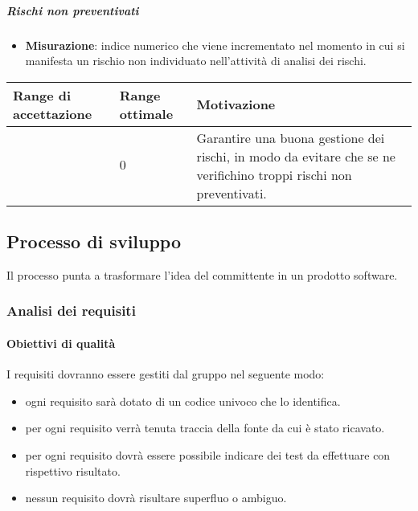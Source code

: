 \subparagraph{Rischi non preventivati}

\begin{itemize}
\item \textbf{Misurazione}: indice numerico che viene incrementato nel momento in cui si manifesta un rischio non individuato nell'attività di analisi dei rischi.
\end{itemize}

\begin{center}
	\begin{tabular}{|P{2.5cm}|P{2.5cm}|P{6cm}|}
		\hline
			\textbf{Range di accettazione}	& \textbf{Range ottimale} & \textbf{Motivazione} \\
			\hline
			[$0 - 5$] & $0$ & Garantire una buona gestione dei rischi, in modo da evitare che se ne verifichino troppi rischi non preventivati. \\
			\hline
			\end{tabular}
\end{center}

\subsection{Processo di sviluppo}

Il processo punta a trasformare l'idea del committente in un prodotto software.

\subsubsection{Analisi dei requisiti}

\paragraph{Obiettivi di qualità}
I requisiti dovranno essere gestiti dal gruppo nel seguente modo:

\begin{itemize}
\item ogni requisito sarà dotato di un codice univoco che lo identifica.
\item per ogni requisito verrà tenuta traccia della fonte da cui è stato ricavato.
\item per ogni requisito dovrà essere possibile indicare dei test da effettuare con rispettivo risultato.
\item nessun requisito dovrà risultare superfluo o ambiguo.
\end{itemize}

